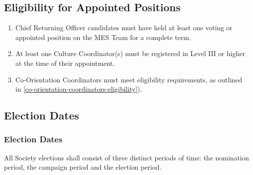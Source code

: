 \subsection{Eligibility for Appointed Positions}
\label{eligibility-for-appointed-positions}

\begin{enumerate}
 \item
  Chief Returning Officer candidates must have held at least one voting or appointed position on the MES Team for a complete term.
 \item
  At least one Culture Coordinator(s) must be registered in Level III or higher at the time of their appointment.
 \item
  Co-Orientation Coordinators must meet eligibility requirements, as outlined in \ref{co-orientation-coordinators-eligibility}).
\end{enumerate}

\subsection{Election Dates}
\label{election-dates}

\subsubsection{Election Dates}
\label{election-dates-1}
All Society elections shall consist of three distinct periods of time:
the nomination period, the campaign period and the election period.


